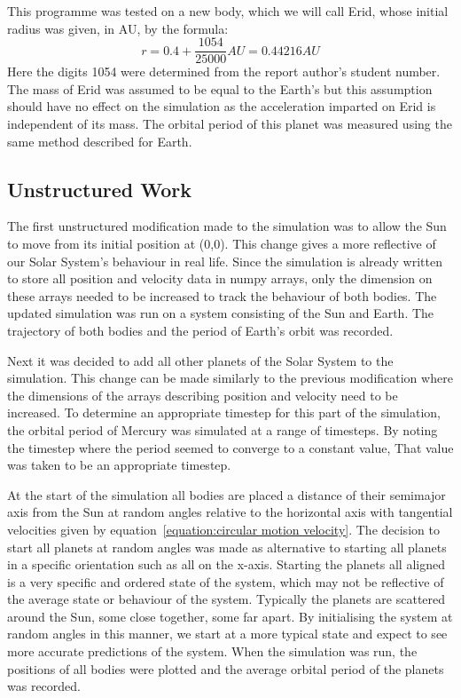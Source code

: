 \documentclass[11pt, a4paper, onecolumn]{article}
\begin{document}
This programme was tested on a new body, which we will call Erid, whose initial radius was given, in AU, by the formula:
\begin{equation}
    r=0.4+\frac{1054}{25000} AU=0.44216 AU
\end{equation} 
Here the digits 1054 were determined from the report author's student number. 
The mass of Erid was assumed to be equal to the Earth's but this assumption should have no effect on the simulation as the acceleration imparted on Erid 
is independent of its mass. 
The orbital period of this planet was measured using the same method described for Earth.


\subsection{Unstructured Work}
The first unstructured modification made to the simulation was to allow the Sun to move from its initial position at (0,0). 
This change gives a more reflective of our Solar System's behaviour in real life. 
Since the simulation is already written to store all position and velocity data in numpy arrays, only the dimension on these arrays needed to be increased
to track the behaviour of both bodies. 
The updated simulation was run on a system consisting of the Sun and Earth. 
The trajectory of both bodies and the period of Earth's orbit was recorded. 


Next it was decided to add all other planets of the Solar System to the simulation. 
This change can be made similarly to the previous modification where the dimensions of the arrays describing position and velocity need to be increased. 
To determine an appropriate timestep for this part of the simulation, the orbital period of Mercury was simulated at a range of timesteps.
By noting the timestep where the period seemed to converge to a constant value, That value was taken to be an appropriate timestep.  


At the start of the simulation all bodies are placed a distance of their semimajor axis\cite{planets_data} from the Sun at random angles relative to 
the horizontal axis with tangential velocities given by equation~\ref{equation:circular motion velocity}. 
The decision to start all planets at random angles was made as alternative to starting all planets in a specific orientation such as all on the x-axis. 
Starting the planets all aligned is a very specific and ordered state of the system, which may not be reflective of the average state or behaviour of the system. 
Typically the planets are scattered around the Sun, some close together, some far apart. 
By initialising the system at random angles in this manner, we start at a more typical state and expect to see more accurate predictions of the system. 
When the simulation was run, the positions of all bodies were plotted and the average orbital period of the planets was recorded. 
\end{document}

